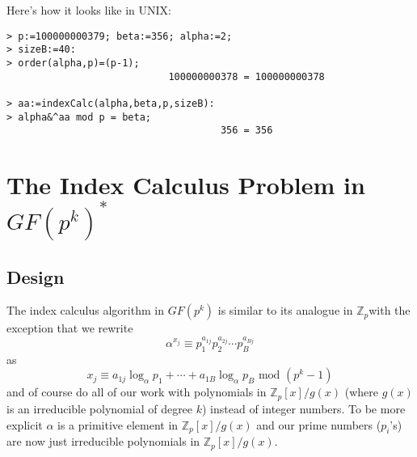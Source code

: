 \documentclass[article,oneside]{memoir}
\begin{document}
\newpage
Here's how it looks like in UNIX:
\begin{verbatim}
> p:=100000000379; beta:=356; alpha:=2;
> sizeB:=40:
> order(alpha,p)=(p-1);
                            100000000378 = 100000000378

> aa:=indexCalc(alpha,beta,p,sizeB):
> alpha&^aa mod p = beta;
                                     356 = 356
\end{verbatim}

\section*{The Index Calculus Problem in $GF(p^k)^*$}

\subsection*{Design}
The index calculus algorithm in $GF(p^k)$ is similar to its analogue in $\mathbb{Z}_p$with the exception that we rewrite $$\alpha^{x_j} \equiv  p_1^{a_{1j}} p_2^{a_{2j}} \cdots p_B^{a_{Bj}}$$
as $$x_j \equiv a_{1j} \log_\alpha p_1 + \cdots + a_{1B} \log_\alpha p_B \textrm{ mod } (p^k-1)$$ and of course do all of our work with polynomials in $\mathbb{Z}_p[x] / g(x)$ (where $g(x)$ is an irreducible polynomial of degree $k$) instead of integer numbers. To be more explicit $\alpha$ is a primitive element in $\mathbb{Z}_p[x] / g(x)$ and our prime numbers ($p_i$'s) are now just irreducible polynomials in $\mathbb{Z}_p[x] / g(x)$.
\end{document}

